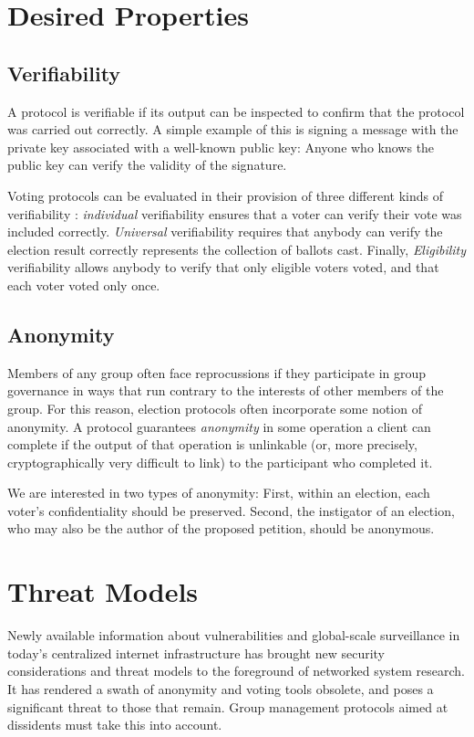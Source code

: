 \section{Desired Properties}
  \subsection{Verifiability}\label{Subsection:verif}
  A protocol is verifiable if its output can be inspected to confirm that the
  protocol was carried out correctly. A simple example of this is signing a
  message with the private key associated with a well-known public key: Anyone
  who knows the public key can verify the validity of the signature.

  Voting protocols can be evaluated in their provision of three different
  kinds of verifiability \cite{kremer_election_2010}: \emph{individual}
  verifiability ensures that a voter can verify their vote was included
  correctly. \emph{Universal} verifiability requires that anybody can verify
  the election result correctly represents the collection of ballots cast.
  Finally, \emph{Eligibility} verifiability allows anybody to verify that
  only eligible voters voted, and that each voter voted only once.


  \subsection{Anonymity}\label{Subsection:anon}
  Members of any group often face reprocussions if they participate in group
  governance in ways that run contrary to the interests of other members of
  the group. For this reason, election protocols often incorporate some notion
  of anonymity. A protocol guarantees \emph{anonymity} in some operation a
  client can complete if the output of that operation is unlinkable (or, more
  precisely, cryptographically very difficult to link) to the participant who
  completed it\cite{ford_hiding_2014}.

  We are interested in two types of anonymity: First, within an election,
  each voter's confidentiality should be preserved. Second, the instigator of an
  election, who may also be the author of the proposed petition, should be
  anonymous.

\section{Threat Models}
  Newly available information about vulnerabilities and global-scale
  surveillance in today's centralized internet infrastructure has brought new
  security considerations and threat models to the foreground of networked
  system research. It has rendered a swath of anonymity and voting tools
  obsolete, and poses a significant threat to those that remain. Group
  management protocols aimed at dissidents must take this into account.

